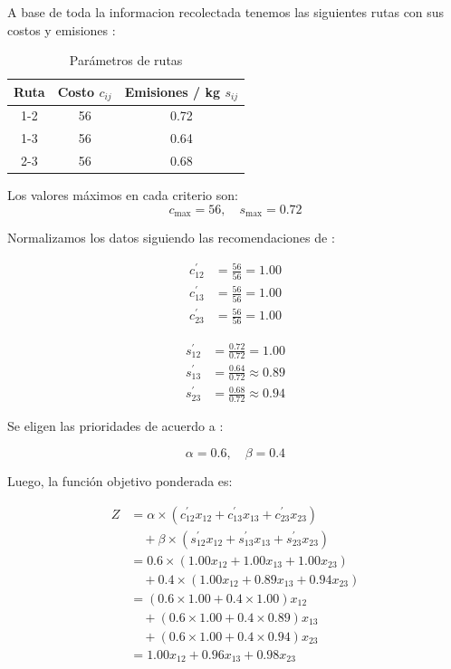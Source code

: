 \documentclass[11pt, a4paper]{article}
\begin{document}
A base de toda la informacion recolectada tenemos las siguientes rutas con sus costos y emisiones \citep{OrozcoGutierrez2018}:

\begin{table}[H]
\centering
\begin{tabular}{|c|c|c|}
\hline
\textbf{Ruta} & \textbf{Costo \( c_{ij} \)} & \textbf{Emisiones / kg \( s_{ij} \)}\\
\hline
1-2 & 56 & 0.72 \\
\hline
1-3 & 56 & 0.64 \\
\hline
2-3 & 56 & 0.68 \\
\hline
\end{tabular}
\caption{Parámetros de rutas }
\label{tab:rutas}
\end{table}

Los valores máximos en cada criterio son:
\begin{equation}
c_{\max} = 56, \quad s_{\max} = 0.72
\end{equation}

Normalizamos los datos siguiendo las recomendaciones de \citet{Winston2004}:

\begin{align}
c_{12}^\prime &= \frac{56}{56} = 1.00 \\
c_{13}^\prime &= \frac{56}{56} = 1.00 \\
c_{23}^\prime &= \frac{56}{56} = 1.00
\end{align}

\begin{align}
s_{12}^\prime &= \frac{0.72}{0.72} = 1.00 \\
s_{13}^\prime &= \frac{0.64}{0.72} \approx 0.89 \\
s_{23}^\prime &= \frac{0.68}{0.72} \approx 0.94
\end{align}

Se eligen las prioridades de acuerdo a \citet{Chopra2018}:

\begin{equation}
\alpha = 0.6, \quad \beta = 0.4
\end{equation}

Luego, la función objetivo ponderada es:

\begin{align}
Z &= \alpha \times (c_{12}^\prime x_{12} + c_{13}^\prime x_{13} + c_{23}^\prime x_{23}) \nonumber \\
&\quad + \beta \times (s_{12}^\prime x_{12} + s_{13}^\prime x_{13} + s_{23}^\prime x_{23}) \nonumber \\
&= 0.6 \times (1.00 x_{12} + 1.00 x_{13} + 1.00 x_{23}) \nonumber \\
&\quad + 0.4 \times (1.00 x_{12} + 0.89 x_{13} + 0.94 x_{23}) \nonumber \\
&= (0.6 \times 1.00 + 0.4 \times 1.00) x_{12} \nonumber \\
&\quad + (0.6 \times 1.00 + 0.4 \times 0.89) x_{13} \nonumber \\
&\quad + (0.6 \times 1.00 + 0.4 \times 0.94) x_{23} \nonumber \\
&= 1.00 x_{12} + 0.96 x_{13} + 0.98 x_{23}
\end{align}
\end{document}
